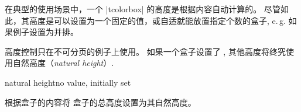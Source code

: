 在典型的使用场景中，一个 |tcolorbox| 的高度是根据内容自动计算的。 
尽管如此，其高度是可以设置为一个固定的值，或自适就能放置指定个数的盒子, e.\,g. 如果例子设置为并排。

\bigskip
\begin{marker}

高度控制只在不可分页的例子上使用。
如果一个盒子设置了 , 其他高度将终究使用自然高度（\emph{natural height}）.
\end{marker}
\bigskip


\begin{docTcbKey}{natural height}{}{no value, initially set}

根据盒子的内容将%
盒子的总高度设置为其自然高度。
\end{docTcbKey}

